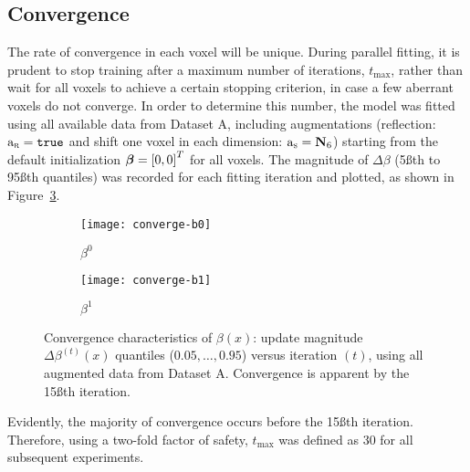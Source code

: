 \subsection{Convergence}
The rate of convergence in each voxel will be unique.
During parallel fitting, it is prudent to stop training after
a maximum number of iterations, $t_{\max}$,
rather than wait for all voxels to achieve a certain stopping criterion,
in case a few aberrant voxels do not converge.
In order to determine this number, the model was fitted
using all available data from Dataset A, including augmentations
(reflection: $\mathrm{a}_{\textsc{r}} = \texttt{true}$ and
shift one voxel in each dimension: $\mathrm{a}_{\textsc{s}} = \mathbf{N}_6$) 
starting from the default initialization $\bm{\beta} = {[0,0]}^T$ for all voxels.
The magnitude of $\Delta\beta$ (5\ss{th} to 95\ss{th} quantiles)
was recorded for each fitting iteration and plotted,
as shown in Figure~\ref{fig:converge}.
\par
\begin{figure}
  \centering
  \begin{subfigure}{\plotwidth}
    \centering
    \texttt{[image: converge-b0]}
    \caption{$\beta^0$}%
    \label{fig:converge-b0}
  \end{subfigure}
  \begin{subfigure}{\plotwidth}
    \centering
    \texttt{[image: converge-b1]}
    \caption{$\beta^1$}%
    \label{fig:converge-b1}
  \end{subfigure}
  \caption{Convergence characteristics of $\beta(x)$:
    update magnitude $\Delta\beta^{(t)}(x)$ quantiles ($0.05, \dots, 0.95$)
    versus iteration $(t)$,
    using all augmented data from Dataset A.
    Convergence is apparent by the 15\ss{th} iteration.}%
  \label{fig:converge}
\end{figure}
Evidently, the majority of convergence occurs before the 15\ss{th} iteration.
Therefore, using a two-fold factor of safety, $t_{\max}$ was defined as 30
for all subsequent experiments.
